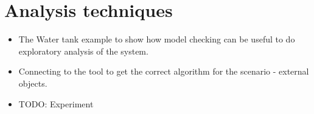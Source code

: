 \section{Analysis techniques}\label{sc:casestudy}
\begin{itemize}
  \item The Water tank example to show how model checking can be useful to do exploratory analysis of the system.
  \item Connecting to the tool to get the correct algorithm for the scenario - external objects.
  \item TODO: Experiment
\end{itemize}
